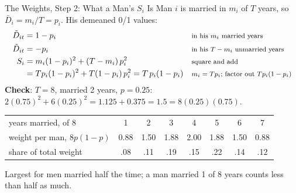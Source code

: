 \documentclass[aspectratio=169,11pt,xcolor=dvipsnames]{beamer}
\begin{document}
\begin{frame}{The Weights, Step 2: What a Man's $S_i$ Is}
Man $i$ is married in $m_i$ of $T$ years, so $\bar D_i = m_i/T = p_i$. His demeaned 0/1 values:
\begin{align*}
  \tilde D_{it} &= 1 - p_i
   && \text{\footnotesize in his $m_i$ married years} \\
  \tilde D_{it} &= -p_i
   && \text{\footnotesize in his $T - m_i$ unmarried years} \\
  S_i &= m_i(1-p_i)^2 + (T-m_i)\,p_i^2
   && \text{\footnotesize square and add} \\
  &= Tp_i(1-p_i)^2 + T(1-p_i)\,p_i^2 = T\,p_i(1-p_i)
   && \text{\footnotesize $m_i = Tp_i$; factor out $Tp_i(1-p_i)$}
\end{align*}
\textbf{Check}: $T = 8$, married 2 years, $p = 0.25$: $2(0.75)^2 + 6(0.25)^2 = 1.125 + 0.375 = 1.5
= 8(0.25)(0.75)$.
\vskip2pt
\begin{center}\footnotesize
\renewcommand{\arraystretch}{1.0}
\begin{tabular}{@{}lccccccc@{}}
\toprule
years married, of 8 & 1 & 2 & 3 & 4 & 5 & 6 & 7 \\
weight per man, $8p(1-p)$ & 0.88 & 1.50 & 1.88 & 2.00 & 1.88 & 1.50 & 0.88 \\
share of total weight & .08 & .11 & .19 & .15 & .22 & .14 & .12 \\
\bottomrule
\end{tabular}
\end{center}
\vskip2pt
Largest for men married half the time; a man married 1 of 8 years counts less than half as much.
\end{frame}
\end{document}

